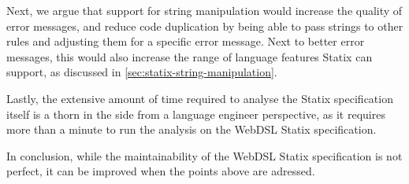     Next, we argue that support for string manipulation would increase the quality of error messages, and reduce code duplication by being able to pass strings to other rules and adjusting them for a specific error message. Next to better error messages, this would also increase the range of language features Statix can support, as discussed in \cref{sec:statix-string-manipulation}.

    Lastly, the extensive amount of time required to analyse the Statix specification itself is a thorn in the side from a language engineer perspective, as it requires more than a minute to run the analysis on the WebDSL Statix specification.

    In conclusion, while the maintainability of the WebDSL Statix specification is not perfect, it can be improved when the points above are adressed.
